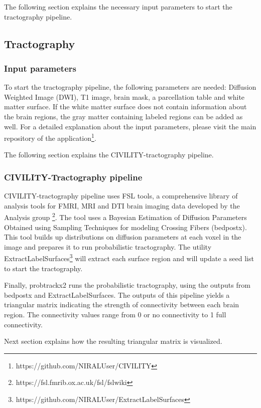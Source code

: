 \documentclass[]{spie}  %
\begin{document}
The following section explains the necessary input parameters to start the tractography pipeline. 

\subsection{Tractography}

\subsubsection{Input parameters}

To start the tractography pipeline, the following parameters are needed: Diffusion Weighted Image (DWI), T1 image, brain mask, a parcellation table
and white matter surface. If the white matter surface does not contain information about the brain regions, 
the gray matter containing labeled regions can be added as well. 
For a detailed explanation about the input parameters, please visit the main repository of the application\footnote{https://github.com/NIRALUser/CIVILITY}.

The following section explains the CIVILITY-tractography pipeline.

\subsubsection{CIVILITY-Tractography pipeline}

CIVILITY-tractography pipeline uses FSL tools, a comprehensive library of analysis tools for FMRI, MRI and DTI brain imaging data developed by the Analysis group \footnote{https://fsl.fmrib.ox.ac.uk/fsl/fslwiki}.
The tool uses a Bayesian Estimation of Diffusion Parameters Obtained using Sampling Techniques for modeling Crossing Fibers (bedpostx). 
This tool builds up distributions on diffusion parameters at each voxel in the image and prepares it to run probabilistic tractography. 
The utility ExtractLabelSurfaces\footnote{https://github.com/NIRALUser/ExtractLabelSurfaces} will extract each surface region and will update a seed list to start the tractography. 

Finally, probtrackx2 runs the probabilistic tractography, using the outputs from bedpostx and ExtractLabelSurfaces. 
The outputs of this pipeline yields a triangular matrix indicating the strength of connectivity between each brain region.
The connectivity values range from 0 or no connectivity to 1 full connectivity.

Next section explains how the resulting triangular matrix is visualized.
\end{document}
